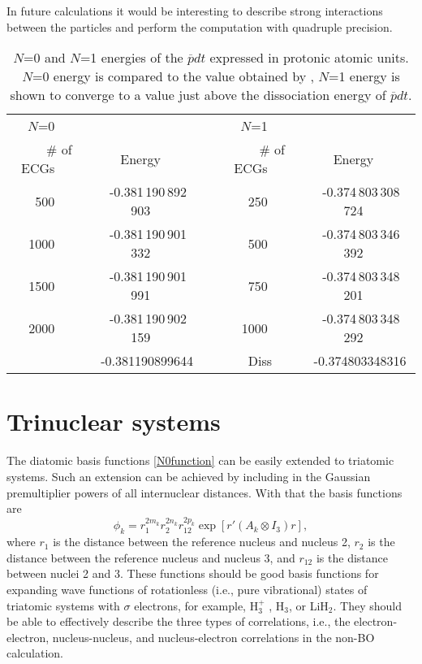 In future calculations it would be interesting to describe 
strong interactions between the particles and perform the
computation with quadruple precision. 

\begin{table}[t]
\caption[$N$=0 and $N$=1 energies of the $\overline{p}dt$]
{$N$=0 and $N$=1 energies of the $\overline{p}dt$ expressed in
protonic atomic units. $N$=0 energy is compared to the value obtained by
\cite{frolov_pdt}, $N$=1 energy is shown to converge to a value
just above the dissociation energy of $\overline{p}dt$.  }
\centering
\begin{tabular}{r c   r c}
\hline\hline
$N$=0	~~&~~		~~&~~	$N$=1	~~&~~		~~\\
\# of ECGs	~~&~~	Energy	~~&~~	\# of ECGs	~~&~~	Energy	~~\\
\hline
500	~~&~~	-0.381\,190\,892\,903 &~~	250	~~&~~	-0.374\,803\,308\,724 \\
1000	~~&~~	-0.381\,190\,901\,332 &~~	500	~~&~~	-0.374\,803\,346\,392 \\
1500	~~&~~	-0.381\,190\,901\,991 &~~	750	~~&~~	-0.374\,803\,348\,201 \\
2000	~~&~~	-0.381\,190\,902\,159 &~~	1000	~~&~~	-0.374\,803\,348\,292 \\
\hline
\cite{frolov_pdt}~~&~~-0.381190899644 &~~Diss~~&~~-0.374803348316 \\
\hline
\end{tabular}
\label{pdtenergies}
\end{table}

\section{Trinuclear systems}

The diatomic basis functions \ref{N0function} can be easily extended 
to triatomic systems. Such an extension can be achieved by including 
in the Gaussian premultiplier powers of all internuclear distances. 
With that the basis functions are
\begin{equation}
\phi_k = r_1^{2m_k} r_2^{2n_k} r_{12}^{2p_k} \exp [r'(A_k \otimes I_3) r],
\label{3_1}
\end{equation}
where $r_1$ is the distance between the reference nucleus and
nucleus 2, $r_2$ is the distance between the reference nucleus and nucleus 3, 
and $r_{12}$ is the distance between nuclei 2 and 3. 
These functions should be good basis functions for expanding wave functions 
of rotationless (i.e., pure vibrational) states of triatomic systems with 
$\sigma$ electrons, for example, H$_3^+$ , H$_3$, or LiH$_2$. 
They should be able to effectively describe the three types of correlations, 
i.e., the electron-electron, nucleus-nucleus, and nucleus-electron correlations 
in the non-BO calculation.

